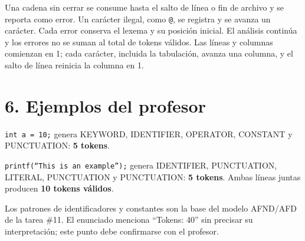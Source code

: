 \documentclass[11pt,letterpaper]{article}
\newcommand{\tok}[1]{\texttt{#1}}
\begin{document}
Una cadena sin cerrar se consume hasta el salto de línea o fin de archivo y se reporta como error. Un carácter ilegal, como \tok{@}, se registra y se avanza un carácter. Cada error conserva el lexema y su posición inicial. El análisis continúa y los errores no se suman al total de tokens válidos. Las líneas y columnas comienzan en 1; cada carácter, incluida la tabulación, avanza una columna, y el salto de línea reinicia la columna en 1.

\section*{6. Ejemplos del profesor}
\tok{int a = 10;} genera KEYWORD, IDENTIFIER, OPERATOR, CONSTANT y PUNCTUATION: \textbf{5 tokens}.

\tok{printf(“This is an example”);} genera IDENTIFIER, PUNCTUATION, LITERAL, PUNCTUATION y PUNCTUATION: \textbf{5 tokens}. Ambas líneas juntas producen \textbf{10 tokens válidos}.

Los patrones de identificadores y constantes son la base del modelo AFND/AFD de la tarea \#11. El enunciado menciona ``Tokens: 40'' sin precisar su interpretación; este punto debe confirmarse con el profesor.
\end{document}
